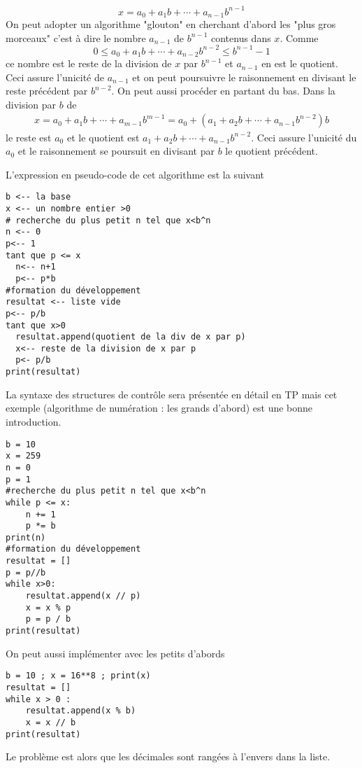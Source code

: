 \begin{demo}
\begin{displaymath}
 x=a_0 + a_1 b +\cdots +a_{n-1}b^{n-1}
\end{displaymath}
On peut adopter un algorithme "glouton" en cherchant d'abord les "plus gros morceaux" c'est à dire le nombre $a_{n-1}$ de $b^{n-1}$ contenus dans $x$. Comme 
\begin{displaymath}
 0\leq a_0 + a_1 b +\cdots +a_{n-2}b^{n-2}\leq b^{n-1}-1
\end{displaymath}
ce nombre est le reste de la division de $x$ par $b^{n-1}$ et $a_{n-1}$ en est le quotient. Ceci assure l'unicité de $a_{n-1}$ et on peut poursuivre le raisonnement en divisant le reste précédent par $b^{n-2}$.\newline
On peut aussi procéder en partant du bas. Dans la division par $b$ de
\begin{align*}
 x= a_0 + a_1 b +\cdots +a_{m-1}b^{m-1} = a_0 +(a_1+a_2b+\cdots+a_{n-1}b^{n-2})b
\end{align*}
le reste est $a_0$ et le quotient est $a_1+a_2b+\cdots+a_{n-1}b^{n-2}$. Ceci assure l'unicité du $a_0$ et le raisonnement se poursuit en divisant par $b$ le quotient précédent.
\end{demo}
L'expression en pseudo-code de cet algorithme est la suivant
\begin{verbatim}
b <-- la base
x <-- un nombre entier >0
# recherche du plus petit n tel que x<b^n
n <-- 0
p<-- 1
tant que p <= x
  n<-- n+1
  p<-- p*b
#formation du développement
resultat <-- liste vide
p<-- p/b
tant que x>0
  resultat.append(quotient de la div de x par p)
  x<-- reste de la division de x par p
  p<- p/b
print(resultat)
\end{verbatim}
La syntaxe des structures de contrôle sera présentée en détail en TP mais cet exemple (algorithme de numération : les grands d'abord) est une bonne introduction.
\begin{verbatim}
b = 10
x = 259
n = 0
p = 1
#recherche du plus petit n tel que x<b^n
while p <= x:
    n += 1
    p *= b
print(n)
#formation du développement
resultat = []
p = p//b
while x>0:
    resultat.append(x // p)
    x = x % p
    p = p / b
print(resultat) 
\end{verbatim}
On peut aussi implémenter avec les petits d'abords
  \begin{verbatim}
b = 10 ; x = 16**8 ; print(x)
resultat = []
while x > 0 :
    resultat.append(x % b)
    x = x // b
print(resultat)  
\end{verbatim}
Le problème est alors que les décimales sont rangées à l'envers dans la liste. 

\printindex

 